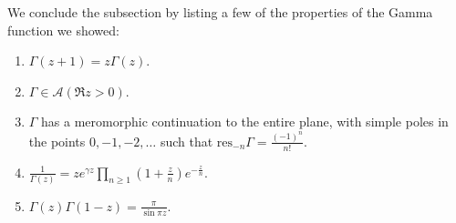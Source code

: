 \documentclass[11pt]{article} %
\theoremstyle{definition}
\newcommand{\res}{\text{res}}
\begin{document}
We conclude the subsection by listing a few of the properties of the Gamma function we showed:

\begin{enumerate}
\item $\Gamma\left(z+1\right) = z\Gamma\left(z\right)$.
\item $\Gamma \in \mathcal{A}\left(\Re z > 0\right)$.
\item $\Gamma$ has a meromorphic continuation to the entire plane, with simple poles in the points $0,-1,-2,\dots$ such that $\res_{-n} \Gamma = \frac{\left(-1\right)^n}{n!}$.
\item $\frac{1}{\Gamma\left(z\right)} = ze^{\gamma z}\prod_{n \geq 1}\left(1+\frac{z}{n}\right)e^{-\frac{z}{n}}$.
\item $\Gamma\left(z\right)\Gamma\left(1-z\right) = \frac{\pi}{\sin \pi z}$.
\end{enumerate}
\end{document}
